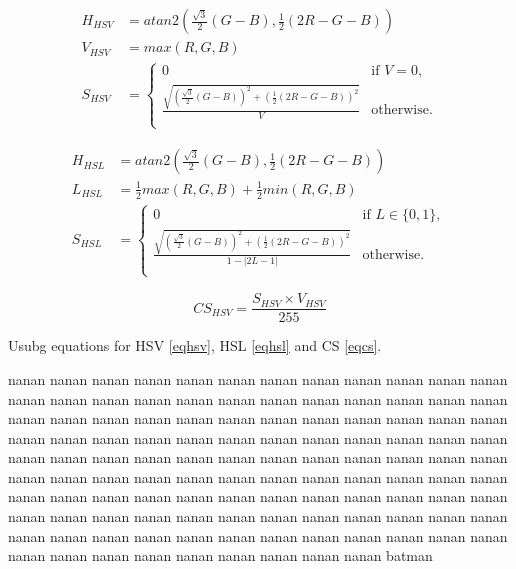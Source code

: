 \documentclass[11pt,a4paper]{report}
\begin{document}
\begin{multicols}{2}
\begin{figure}[!htb]
\begin{equation}
\begin{aligned}
H_{HSV}  &= atan2\left(\frac{\sqrt{3}}{2}(G-B), \frac{1}{2}(2R-G-B)\right) \\
V_{HSV}  &= max(R,G,B) \\
S_{HSV}  &= \left\{
  \begin{array}{ll}
    0  &  \text{if } V = 0, \\
    \frac{\sqrt{ \left(\frac{\sqrt{3}}{2}(G-B)\right)^2
               + \left(\frac{1}{2}(2R-G-B)\right)^2 }}{V}
  &  \text{otherwise}. \\
  \end{array}
            \right.
\label{eqhsv}
\end{aligned}
\end{equation}
\end{figure}

\begin{figure}[!htb]
\begin{equation}
\begin{aligned}
H_{HSL}  &= atan2\left(\frac{\sqrt{3}}{2}(G-B), \frac{1}{2}(2R-G-B)\right) \\
L_{HSL}  &= \frac{1}{2}max(R,G,B) + \frac{1}{2}min(R,G,B) \\
S_{HSL}  &= \left\{
  \begin{array}{ll}
    0  &  \text{if } L \in \{0,1\}, \\
    \frac{\sqrt{ \left(\frac{\sqrt{3}}{2}(G-B)\right)^2
               + \left(\frac{1}{2}(2R-G-B)\right)^2 }}{1 - \lvert 2L-1 \rvert}
  &  \text{otherwise}. \\
  \end{array}
           \right.
\label{eqhsl}
\end{aligned}
\end{equation}
\end{figure}

\begin{equation}
CS_{HSV} = \frac{S_{HSV} \times V_{HSV}}{255}
\label{eqcs}
\end{equation}

Usubg equations for HSV \ref{eqhsv}, HSL \ref{eqhsl} and CS \ref{eqcs}.

nanan nanan nanan nanan nanan nanan nanan nanan nanan nanan nanan nanan nanan
nanan nanan nanan nanan nanan nanan nanan nanan nanan nanan nanan nanan nanan
nanan nanan nanan nanan nanan nanan nanan nanan nanan nanan nanan nanan nanan
nanan nanan nanan nanan nanan nanan nanan nanan nanan nanan nanan nanan nanan
nanan nanan nanan nanan nanan nanan nanan nanan nanan nanan nanan nanan nanan
nanan nanan nanan nanan nanan nanan nanan nanan nanan nanan nanan nanan nanan
nanan nanan nanan nanan nanan nanan nanan nanan nanan nanan nanan nanan nanan
nanan nanan nanan nanan nanan nanan nanan nanan nanan nanan nanan nanan nanan
nanan nanan nanan nanan nanan nanan nanan nanan nanan nanan nanan nanan nanan
batman


\end{multicols}
\end{document}
